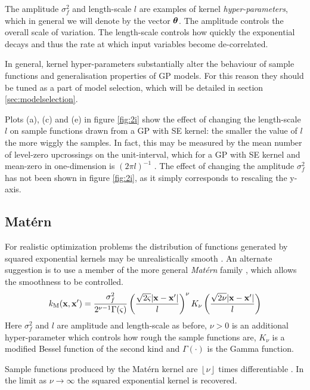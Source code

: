 The amplitude $\sigma_f^2$ and length-scale $l$ are examples of kernel \textit{hyper-parameters}, which in general we will denote by the vector $\bm{\theta}$. The amplitude controls the overall scale of variation. The length-scale controls how quickly the exponential decays and thus the rate at which input variables become de-correlated.

In general, kernel hyper-parameters substantially alter the behaviour of sample functions and generalisation properties of GP models. For this reason they should be tuned as a part of model selection, which will be detailed in section \ref{sec:modelselection}. 

Plots (a), (c) and (e) in figure \ref{fig:2i} show the effect of changing the length-scale $l$ on sample functions drawn from a GP with SE kernel: the smaller the value of $l$ the more wiggly the samples. In fact, this may be measured by the mean number of level-zero upcrossings on the unit-interval, which for a GP with SE kernel and mean-zero in one-dimension is $(2 \pi l)^{-1}$ \cite{rasmussen}. The effect of changing the amplitude $\sigma_f^2$ has not been shown in figure \ref{fig:2i}, as it simply corresponds to rescaling the y-axis.

\subsection{Matérn}

For realistic optimization problems the distribution of functions generated by squared exponential kernels may be unrealistically smooth \citep{snoek2012practical} \citep{stein2012interpolation}. An alternate suggestion is to use a member of the more general \textit{Matérn} family \citep{matern2013spatial}, which allows the smoothness to be controlled.
%
\begin{equation}
k_\mathrm{M}(\mathbf{x}, \mathbf{x}') = 
\frac{\sigma_f^2}{2^{\nu - 1}\Gamma(\varsigma)} \left(\frac{\sqrt{2\varsigma}\lvert \mathbf{x} - \mathbf{x}' \rvert}{l}\right)^\nu
K_\nu\left(\frac{\sqrt{2\nu}\lvert \mathbf{x} - \mathbf{x}' \rvert}{l}\right)
\end{equation}
%
Here $\sigma_f^2$ and $l$ are amplitude and length-scale as before, $\nu > 0$ is an additional hyper-parameter which controls how rough the sample functions are, $K_\nu$ is a modified Bessel function of the second kind and $\Gamma(\cdot)$ is the Gamma function. 

Sample functions produced by the Matérn kernel are $\left\lfloor{\nu}\right\rfloor$ times differentiable \citep{santner2013design}. In the limit as $\nu \to \infty$ the squared exponential kernel is recovered. 


